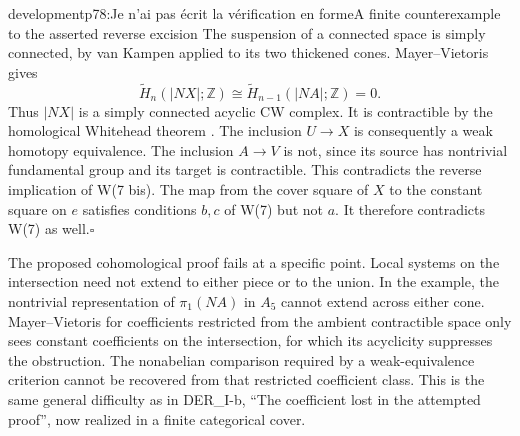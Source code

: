 \begin{dcomment}{development}{p78:Je n'ai pas écrit la vérification en forme}{A finite counterexample to the asserted reverse excision}
The suspension of a connected space is simply connected, by van Kampen applied to its two thickened cones. Mayer--Vietoris gives
\[
 \widetilde H_n(|NX|;\mathbb Z)
       \cong\widetilde H_{n-1}(|NA|;\mathbb Z)=0.
\]
Thus $|NX|$ is a simply connected acyclic CW complex. It is contractible by the homological Whitehead theorem \citep[Corollary~4.33]{Hatcher2002}. The inclusion $U\to X$ is consequently a weak homotopy equivalence. The inclusion $A\to V$ is not, since its source has nontrivial fundamental group and its target is contractible. This contradicts the reverse implication of W(7 bis). The map from the cover square of $X$ to the constant square on $e$ satisfies conditions $b,c$ of W(7) but not $a$. It therefore contradicts W(7) as well.\hfill$\square$

The proposed cohomological proof fails at a specific point. Local systems on the intersection need not extend to either piece or to the union. In the example, the nontrivial representation of $\pi_1(NA)$ in $A_5$ cannot extend across either cone. Mayer--Vietoris for coefficients restricted from the ambient contractible space only sees constant coefficients on the intersection, for which its acyclicity suppresses the obstruction. The nonabelian comparison required by a weak-equivalence criterion cannot be recovered from that restricted coefficient class. This is the same general difficulty as in DER\_I-b, ``The coefficient lost in the attempted proof'', now realized in a finite categorical cover.
\end{dcomment}

